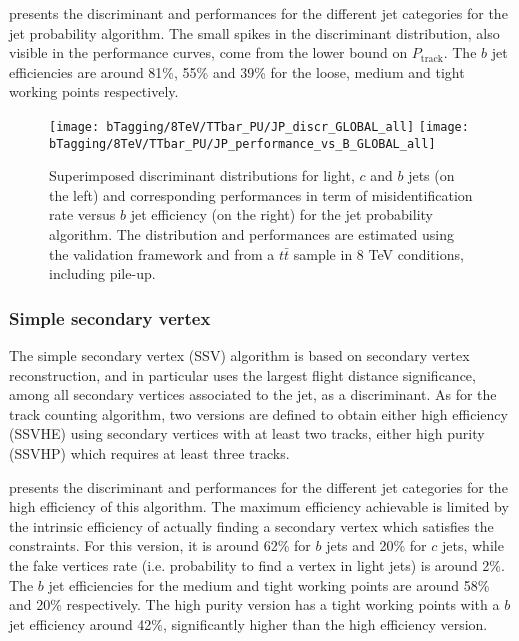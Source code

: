      presents the discriminant and performances for
    the different jet categories for the jet probability algorithm. The small
    spikes in the discriminant distribution, also visible in the performance
    curves, come from the lower bound on $P_\text{track}$. The $b$ jet
    efficiencies are around 81\%, 55\% and 39\% for the loose, medium and tight
    working points respectively.

    \begin{figure}[th!]
        \centering
        \begin{minipage}{\textwidth}
        \texttt{[image: bTagging/8TeV/TTbar\_PU/JP\_discr\_GLOBAL\_all]}
        \texttt{[image: bTagging/8TeV/TTbar\_PU/JP\_performance\_vs\_B\_GLOBAL\_all]}
        \end{minipage}
        \caption{Superimposed discriminant distributions for light, $c$ and $b$
        jets (on the left) and corresponding performances in term of
        misidentification rate versus $b$ jet efficiency (on the right) for the
        jet probability algorithm.  The distribution and performances are
        estimated using the validation framework and from a $t\bar{t}$ sample in
        8 TeV conditions, including pile-up.}
        \label{fig:bTagging/perfJP}
    \end{figure}

        \subsubsection{Simple secondary vertex}

    The simple secondary vertex (SSV) algorithm is based on secondary vertex
    reconstruction, and in particular uses the largest flight distance
    significance, among all secondary vertices associated to the jet, as a
    discriminant. As for the track counting algorithm, two versions are defined
    to obtain either high efficiency (SSVHE) using secondary vertices with at
    least two tracks, either high purity (SSVHP) which requires at least three
    tracks.

     presents the discriminant and performances for
    the different jet categories for the high efficiency of this algorithm.  The
    maximum efficiency achievable is limited by the intrinsic efficiency of
    actually finding a secondary vertex which satisfies the constraints. For
    this version, it is around 62\% for $b$ jets and 20\% for $c$ jets, while
    the fake vertices rate (i.e.  probability to find a vertex in light jets) is
    around 2\%. The $b$ jet efficiencies for the medium and tight working points
    are around 58\% and 20\% respectively. The high purity version has a tight
    working points with a $b$ jet efficiency around 42\%, significantly higher
    than the high efficiency version.

